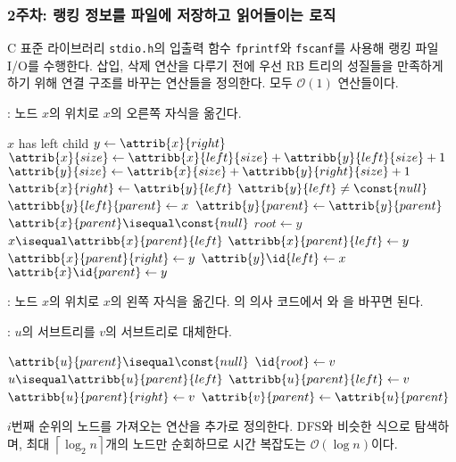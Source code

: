 \subsubsection{2주차: 랭킹 정보를 파일에 저장하고 읽어들이는 로직} C 표준 라이브러리 \texttt{stdio.h}의 입출력 함수
\texttt{fprintf}와 \texttt{fscanf}를 사용해 랭킹 파일 I/O를 수행한다.
삽입, 삭제 연산을 다루기 전에 우선 RB 트리의 성질들을 만족하게 하기 위해 연결 구조를 바꾸는 연산들을 정의한다. 모두 $\mathcal{O}\left(1\right)$ 연산들이다.

: 노드 $x$의 위치로 $x$의 오른쪽 자식을 옮긴다.
\begin{codebox}
\li \If $x$ has left child \Then
\li \Return
    \End
\li $y \gets \attrib{x}{right}$
\li $\attrib{x}{size} \gets \attribb{x}{left}{size} + \attribb{y}{left}{size} + 1$
\li $\attrib{y}{size} \gets \attrib{x}{size} + \attribb{y}{right}{size} + 1$
\li $\attrib{x}{right} \gets \attrib{y}{left}$
\li \If $\attrib{y}{left} \neq \const{null}$ \Then
\li     $\attribb{y}{left}{parent} \gets x$
    \End
\li $\attrib{y}{parent} \gets \attrib{y}{parent}$
\li \If $\attrib{x}{parent} \isequal \const{null}$ \Then
\li     $root \gets y$
\li \ElseIf $x \isequal \attribb{x}{parent}{left}$ \Then
\li     $\attribb{x}{parent}{left} \gets y$
\li \ElseNoIf
\li     $\attribb{x}{parent}{right} \gets y$
    \End
\li $\attrib{y}\id{left} \gets x$
\li $\attrib{x}\id{parent} \gets y$
\end{codebox}

: 노드 $x$의 위치로 $x$의 왼쪽 자식을 옮긴다. 의
의사 코드에서 와 을 바꾸면 된다.

: $u$의 서브트리를 $v$의 서브트리로 대체한다.

\begin{codebox}
\li \If $\attrib{u}{parent} \isequal \const{null}$ \Then
\li     $\id{root} \gets v$
\li \ElseIf $u \isequal \attribb{u}{parent}{left}$ \Then
\li     $\attribb{u}{parent}{left} \gets v$
\li \ElseNoIf
\li     $\attribb{u}{parent}{right} \gets v$
    \End
\li $\attrib{v}{parent} \gets \attrib{u}{parent}$
\end{codebox}

$i$번째 순위의 노드를 가져오는 연산을 추가로 정의한다. DFS와 비슷한 식으로 탐색하며, 최대 $\left\lceil\log_2 n\right\rceil$개의 노드만 순회하므로
시간 복잡도는 $\mathcal{O}\left(\log n\right)$이다.

